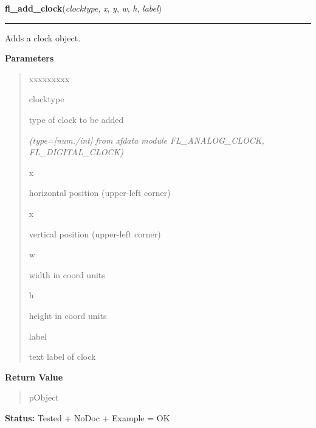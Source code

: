     \vspace{0.5ex}

\hspace{.8\funcindent}\begin{boxedminipage}{\funcwidth}

    \raggedright \textbf{fl\_add\_clock}(\textit{clocktype}, \textit{x}, \textit{y}, \textit{w}, \textit{h}, \textit{label})

    \vspace{-1.5ex}

    \rule{\textwidth}{0.5\fboxrule}
\setlength{\parskip}{2ex}
    Adds a clock object.

\setlength{\parskip}{1ex}
      \textbf{Parameters}
      \vspace{-1ex}

      \begin{quote}
        \begin{Ventry}{xxxxxxxxx}

          \item[clocktype]

          type of clock to be added

            {\it (type=[num./int] from xfdata module FL\_ANALOG\_CLOCK, FL\_DIGITAL\_CLOCK)}

          \item[x]

          horizontal position (upper-left corner)

          \item[x]

          vertical position (upper-left corner)

          \item[w]

          width in coord units

          \item[h]

          height in coord units

          \item[label]

          text label of clock

        \end{Ventry}

      \end{quote}

      \textbf{Return Value}
    \vspace{-1ex}

      \begin{quote}
      pObject

      \end{quote}

\textbf{Status:} Tested + NoDoc + Example = OK



    \end{boxedminipage}


